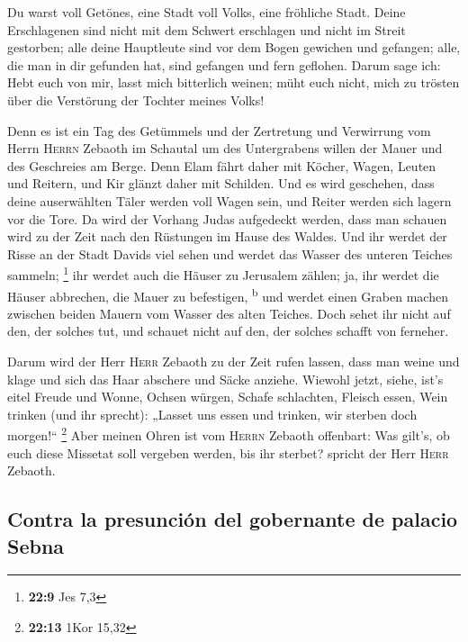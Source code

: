  Du warst voll Getönes, eine Stadt voll Volks, eine
fröhliche Stadt. Deine Erschlagenen sind nicht mit dem Schwert
erschlagen und nicht im Streit gestorben;  alle deine
Hauptleute sind vor dem Bogen gewichen und gefangen; alle, die man in
dir gefunden hat, sind gefangen und fern geflohen.  Darum
sage ich: Hebt euch von mir, lasst mich bitterlich weinen; müht euch
nicht, mich zu trösten über die Verstörung der Tochter meines Volks!

 Denn es ist ein Tag des Getümmels und der Zertretung und
Verwirrung vom Herrn \textsc{Herrn} Zebaoth im Schautal um des
Untergrabens willen der Mauer und des Geschreies am Berge.
 Denn Elam fährt daher mit Köcher, Wagen, Leuten und
Reitern, und Kir glänzt daher mit Schilden.  Und es wird
geschehen, dass deine auserwählten Täler werden voll Wagen sein, und
Reiter werden sich lagern vor die Tore.  Da wird der
Vorhang Judas aufgedeckt werden, dass man schauen wird zu der Zeit nach
den Rüstungen im Hause des Waldes.  Und ihr werdet der
Risse an der Stadt Davids viel sehen und werdet das Wasser des unteren
Teiches sammeln; \footnote{\textbf{22:9} Jes 7,3}  ihr
werdet auch die Häuser zu Jerusalem zählen; ja, ihr werdet die Häuser
abbrechen, die Mauer zu befestigen, \textsuperscript{b} 
und werdet einen Graben machen zwischen beiden Mauern vom Wasser des
alten Teiches. Doch sehet ihr nicht auf den, der solches tut, und
schauet nicht auf den, der solches schafft von ferneher.

 Darum wird der Herr \textsc{Herr} Zebaoth zu der Zeit
rufen lassen, dass man weine und klage und sich das Haar abschere und
Säcke anziehe.  Wiewohl jetzt, siehe, ist's eitel Freude
und Wonne, Ochsen würgen, Schafe schlachten, Fleisch essen, Wein trinken
(und ihr sprecht): „Lasset uns essen und trinken, wir sterben doch
morgen!{}`` \footnote{\textbf{22:13} 1Kor 15,32}  Aber
meinen Ohren ist vom \textsc{Herrn} Zebaoth offenbart: Was gilt's, ob
euch diese Missetat soll vergeben werden, bis ihr sterbet? spricht der
Herr \textsc{Herr} Zebaoth.

\hypertarget{contra-la-presunciuxf3n-del-gobernante-de-palacio-sebna}{%
\subsection{Contra la presunción del gobernante de palacio
Sebna}\label{contra-la-presunciuxf3n-del-gobernante-de-palacio-sebna}}

